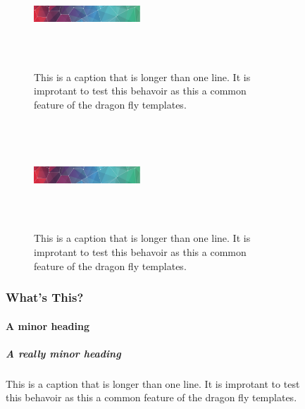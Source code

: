 \documentclass{dragonfly-report}
\begin{document}
\begin{figure}[h]

  \begin{subfigure}{0.45\textwidth}
  \includegraphics[width=40mm,height=40mm]{pattern}
  \caption{This is a caption that is longer than one line. It is improtant to test 
  this behavoir as this a common feature of the dragon fly templates.}
\end{subfigure}\qquad
  \begin{subfigure}{0.45\textwidth}
  \includegraphics[width=40mm,height=40mm]{pattern}
  \caption{This is a caption that is longer than one line. It is improtant to test 
  this behavoir as this a common feature of the dragon fly templates.}
\end{subfigure}

\subsubsection{What's This?}
\lipsum[3]
\paragraph{A minor heading}
\lipsum[5]
\subparagraph{A really minor heading}
\lipsum[4]

\end{figure}

\clearpage
\printbibliography
\end{document}
